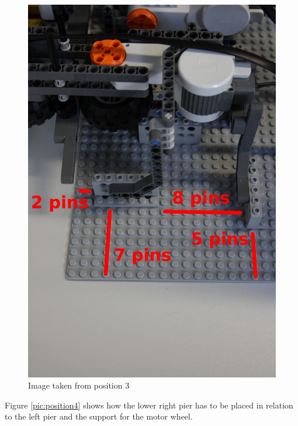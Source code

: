 \documentclass[%
  a4paper,%
  11pt,%
  blue,%
  hyperref	%
  ]{tubsartcl}
\begin{document}
\begin{figure}[!htb]
\begin{center}
\includegraphics[scale=0.35]{graphics_lego/position3.jpg}
\end{center}
\caption{Image taken from position 3}
\label{pic:position3}
\end{figure}

\clearpage

Figure \ref{pic:position4} shows how the lower right pier has to be placed in relation to the left pier and the support for the motor wheel.
\end{document}
